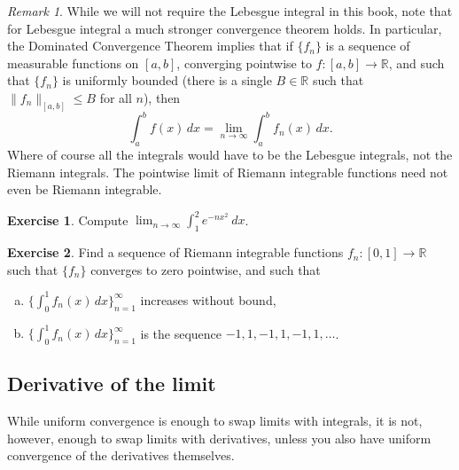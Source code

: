 \documentclass[12pt,openany]{book}
\newcommand{\snorm}[1]{\lVert {#1} \rVert}
\newcommand{\R}{{\mathbb{R}}}
\theoremstyle{plain}
\theoremstyle{remark}
\newtheorem{remark}[thm]{Remark}
\theoremstyle{definition}
\newenvironment{exbox}{%
    \def\FrameCommand{\vrule width 1pt \relax\hspace {10pt}}%
    \MakeFramed {\advance \hsize -\width \FrameRestore }%
}{%
    \endMakeFramed
}
\newenvironment{exparts}{%
    \leavevmode\begin{enumerate}[a),noitemsep,topsep=0pt,parsep=0pt,partopsep=0pt]
}{%
    \end{enumerate}
}
\theoremstyle{exercise}
\newtheorem{exercise}{Exercise}[section]
\theoremstyle{example}
\begin{document}
\begin{remark}
While we will not require the Lebesgue integral in this book, note that
for Lebesgue integral a much stronger convergence theorem holds.  In
particular, the Dominated Convergence Theorem implies that if
$\{ f_n \}$ is a sequence of measurable functions on $[a,b]$,
converging pointwise to $f \colon [a,b] \to \R$, and such that
$\{ f_n \}$ is uniformly bounded (there is a single $B \in \R$ such that
$\snorm{f_n}_{[a,b]} \leq B$ for all $n$), then
\begin{equation*}
\int_a^b f(x) \, dx = \lim_{n\to\infty} \int_a^b f_n(x) \, dx .
\end{equation*}
Where of course all the integrals would have to be the Lebesgue integrals,
not the Riemann integrals.  The pointwise limit of Riemann integrable
functions need not even be Riemann integrable.
\end{remark}

\begin{exbox}
\begin{exercise}
Compute
$\displaystyle \lim_{n\to\infty} \int_1^2 e^{-nx^2} ~dx$.
\end{exercise}

\begin{exercise}
Find a sequence of Riemann integrable functions $f_n \colon [0,1] \to \R$ such
that $\{ f_n \}$ converges to zero pointwise, and such that
\begin{exparts}
\item
$\bigl\{ \int_0^1 f_n(x)\,dx \bigr\}_{n=1}^\infty$ increases without bound,
\item
$\bigl\{ \int_0^1 f_n(x)\,dx \bigr\}_{n=1}^\infty$ is the sequence $-1,1,-1,1,-1,1, \ldots$.
\end{exparts}
\end{exercise}
\end{exbox}

\subsection{Derivative of the limit}

While uniform convergence is enough to swap limits with integrals, it is not,
however, enough to swap limits with derivatives, unless you also have
uniform convergence of the derivatives themselves.
\end{document}
